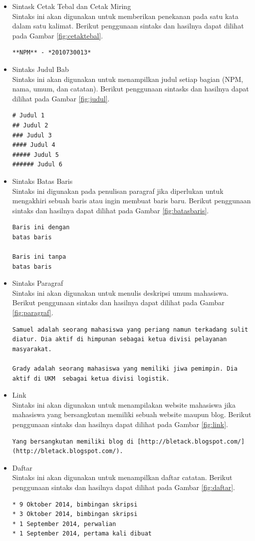 \begin{itemize}
\item Sintask Cetak Tebal dan Cetak Miring\\
Sintaks ini akan digunakan untuk memberikan penekanan pada satu kata dalam satu kalimat. Berikut penggunaan sintaks dan hasilnya dapat dilihat pada Gambar \ref{fig:cetaktebal}.
\begin{lstlisting}
**NPM** - *2010730013*
\end{lstlisting}
\item Sintaks Judul Bab\\
Sintaks ini akan digunakan untuk menampilkan judul setiap bagian (NPM, nama, umum, dan catatan). Berikut penggunaan sintasks dan hasilnya dapat dilihat pada Gambar \ref{fig:judul}.
\begin{lstlisting}
# Judul 1
## Judul 2
### Judul 3
#### Judul 4
##### Judul 5
###### Judul 6
\end{lstlisting}
\item Sintaks Batas Baris\\
Sintaks ini digunakan pada penulisan paragraf jika diperlukan untuk mengakhiri sebuah baris atau ingin membuat baris baru. Berikut penggunaan sintaks dan hasilnya dapat dilihat pada Gambar \ref{fig:batasbaris}.
\begin{lstlisting}
Baris ini dengan   
batas baris

Baris ini tanpa
batas baris
\end{lstlisting}
\item Sintaks Paragraf\\
Sintaks ini akan digunakan untuk menulis deskripsi umum mahasiswa. Berikut penggunaan sintaks dan hasilnya dapat dilihat pada Gambar \ref{fig:paragraf}.
\begin{lstlisting}
Samuel adalah seorang mahasiswa yang periang namun terkadang sulit diatur. Dia aktif di himpunan sebagai ketua divisi pelayanan masyarakat.

Grady adalah seorang mahasiswa yang memiliki jiwa pemimpin. Dia aktif di UKM  sebagai ketua divisi logistik.
\end{lstlisting}
\item Link\\
Sintaks ini akan digunakan untuk menampilakan website mahasiswa jika mahasiswa yang bersangkutan memiliki sebuah website maupun blog. Berikut penggunaan sintaks dan hasilnya dapat dilihat pada Gambar \ref{fig:link}.
\begin{lstlisting}
Yang bersangkutan memiliki blog di [http://bletack.blogspot.com/](http://bletack.blogspot.com/).
\end{lstlisting}
\item Daftar\\
Sintaks ini akan digunakan untuk menampilkan daftar catatan. Berikut penggunaan sintaks dan hasilnya dapat dilihat pada Gambar \ref{fig:daftar}.
\begin{lstlisting}
* 9 Oktober 2014, bimbingan skripsi
* 3 Oktober 2014, bimbingan skripsi
* 1 September 2014, perwalian
* 1 September 2014, pertama kali dibuat
\end{lstlisting}
\end{itemize}


